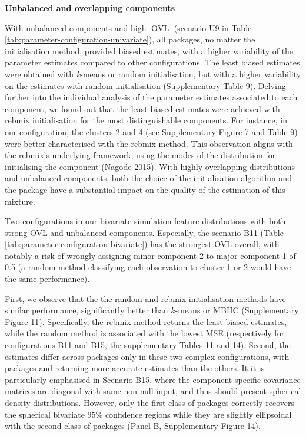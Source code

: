 \textbf{Unbalanced and overlapping components}

With unbalanced components and high \(\operatorname{OVL}\) (scenario U9 in Table
\ref{tab:parameter-configuration-univariate}), all packages, no
matter the initialisation method, provided biased estimates, with a higher variability of the parameter estimates compared to other configurations. The least biased
estimates were obtained with \emph{k}-means or random initialisation, but with a higher variability on the estimates with random initialisation (Supplementary Table 9).
Delving further into the individual analysis of the parameter estimates associated to each component, we found out that the least biased estimates were achieved with rebmix initialisation for the most distinguishable components. For instance, in our configuration, the clusters 2 and 4 (see Supplementary Figure 7 and Table 9) were better characterised with the rebmix method. This observation aligns with the rebmix's underlying framework, using the modes of the distribution for initialising the component (Nagode 2015). With highly-overlapping distributions and unbalanced components, both the choice of the initialisation algorithm and the package have a
substantial impact on the quality of the estimation of this mixture.

Two configurations in our bivariate simulation feature distributions with both strong OVL and unbalanced components. Especially, the scenario B11 (Table \ref{tab:parameter-configuration-bivariate}) has the strongest OVL overall, with notably a risk of wrongly assigning minor component 2 to major component 1 of 0.5 (a random method classifying each observation to cluster 1 or 2 would have the same performance).

First, we observe that the the random and rebmix initialisation methods have similar performance, significantly better than \(k\)-means or MBHC (Supplementary Figure 11). Specifically, the rebmix method returns the least biased estimates, while the random method is associated with the lowest MSE (respectively for configurations B11 and B15, the supplementary Tables 11
and 14). Second, the estimates differ across packages only in these two complex configurations, with packages  and  returning more accurate estimates than the others.
It it is particularly emphasised in Scenario B15, where the component-specific covariance matrices are diagonal with same non-null input, and thus should present spherical density distributions. However, only the first class of packages correctly recovers the spherical bivariate \(95\%\) confidence regions while they are slightly ellipsoidal with the second class of packages (Panel B, Supplementary Figure 14).

